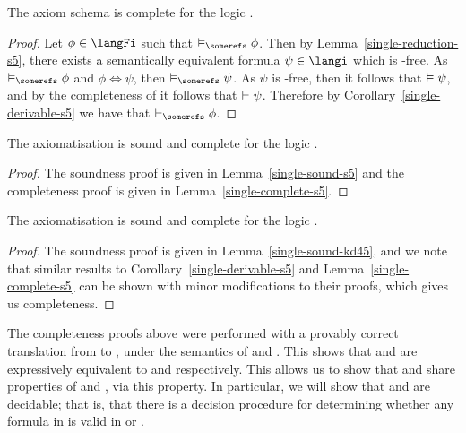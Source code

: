 \begin{lemma}\label{single-complete-s5}
The axiom schema \axiomSiF{} is complete for the logic \logicSiF{}.
\end{lemma}

\begin{proof}
Let $\phi \in \langFi$ such that $\entails_\somerefs \phi$. Then by
Lemma~\ref{single-reduction-s5}, there exists a semantically equivalent formula
$\psi \in \langi$ which is \somerefs-free. As $\entails_\somerefs \phi$ and
$\phi \iff \psi$, then $\entails_\somerefs \psi$. As $\psi$ is
\somerefs-free, then it follows that $\vDash \psi$, and by the
completeness of \axiomSiF{} it follows that $\vdash \psi$.
Therefore by Corollary~\ref{single-derivable-s5} we have that $\proves_\somerefs
\phi$.
\end{proof}

\begin{theorem}
The axiomatisation \axiomSiF{} is sound and complete for the logic \logicSiF{}.
\end{theorem}

\begin{proof}
The soundness proof is given in Lemma~\ref{single-sound-s5} and the completeness
proof is given in Lemma~\ref{single-complete-s5}.
\end{proof}

\begin{theorem}
The axiomatisation \axiomKDiF{} is sound and complete for the logic \logicKDiF{}.
\end{theorem}

\begin{proof}
The soundness proof is given in Lemma~\ref{single-sound-kd45}, and we note that
similar results to Corollary~\ref{single-derivable-s5} and
Lemma~\ref{single-complete-s5} can be shown with minor modifications to their
proofs, which gives us completeness.
\end{proof}

The completeness proofs above were performed with a provably correct translation
from \langFi{} to \langi{}, under the semantics of \logicSiF{} and \logicKDiF{}.
This shows that \logicSiF{} and \logicKDiF{} are expressively equivalent to
\logicSi{} and \logicKDi{} respectively. This allows us to show that \logicSiF{}
and \logicKDiF{} share properties of \logicSi{} and \logicKDi{}, via this
property. In particular, we will show that \logicSiF{} and \logicKDiF{} are
decidable; that is, that there is a decision procedure for determining whether
any formula in \langFi{} is valid in \langSiF{} or \langKDiF{}.

